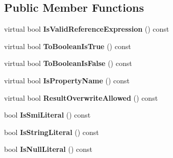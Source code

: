 \subsection*{Public Member Functions}
\begin{DoxyCompactItemize}
\item 
\hypertarget{classv8_1_1internal_1_1_expression_aa55f2c783cd95bc83a5993f514b99b0f}{}virtual bool {\bfseries Is\+Valid\+Reference\+Expression} () const \label{classv8_1_1internal_1_1_expression_aa55f2c783cd95bc83a5993f514b99b0f}

\item 
\hypertarget{classv8_1_1internal_1_1_expression_aaac1281d6505dd5b04859de4c68f99e5}{}virtual bool {\bfseries To\+Boolean\+Is\+True} () const \label{classv8_1_1internal_1_1_expression_aaac1281d6505dd5b04859de4c68f99e5}

\item 
\hypertarget{classv8_1_1internal_1_1_expression_a5fcd433a0f4cf5f91c50721e86efc62b}{}virtual bool {\bfseries To\+Boolean\+Is\+False} () const \label{classv8_1_1internal_1_1_expression_a5fcd433a0f4cf5f91c50721e86efc62b}

\item 
\hypertarget{classv8_1_1internal_1_1_expression_a2e652520da345dbe002e406fd235839b}{}virtual bool {\bfseries Is\+Property\+Name} () const \label{classv8_1_1internal_1_1_expression_a2e652520da345dbe002e406fd235839b}

\item 
\hypertarget{classv8_1_1internal_1_1_expression_a0e4e1b87aa095ccf0095db282cb9775f}{}virtual bool {\bfseries Result\+Overwrite\+Allowed} () const \label{classv8_1_1internal_1_1_expression_a0e4e1b87aa095ccf0095db282cb9775f}

\item 
\hypertarget{classv8_1_1internal_1_1_expression_aa57ffa44f31f9b27600f4e52ba9648db}{}bool {\bfseries Is\+Smi\+Literal} () const \label{classv8_1_1internal_1_1_expression_aa57ffa44f31f9b27600f4e52ba9648db}

\item 
\hypertarget{classv8_1_1internal_1_1_expression_a6b82dadf4112207b9f9ead42db8fb6f9}{}bool {\bfseries Is\+String\+Literal} () const \label{classv8_1_1internal_1_1_expression_a6b82dadf4112207b9f9ead42db8fb6f9}

\item 
\hypertarget{classv8_1_1internal_1_1_expression_a3d4dd9709eeec8ef75d03ec021c9bc80}{}bool {\bfseries Is\+Null\+Literal} () const \label{classv8_1_1internal_1_1_expression_a3d4dd9709eeec8ef75d03ec021c9bc80}


\end{DoxyCompactItemize}
